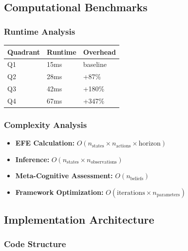 \documentclass[
]{article}
\newcounter{none} %
\providecommand{\tightlist}{%
  \setlength{\itemsep}{0pt}\setlength{\parskip}{0pt}}
\begin{document}
\subsection{Computational
Benchmarks}\label{sec:computational_benchmarks}

\subsubsection{Runtime Analysis}\label{runtime-analysis}

{\def\LTcaptype{none} %
\begin{longtable}[]{@{}lll@{}}
\toprule\noalign{}
Quadrant & Runtime & Overhead \\
\midrule\noalign{}
\endhead
\bottomrule\noalign{}
\endlastfoot
Q1 & 15ms & baseline \\
Q2 & 28ms & +87\% \\
Q3 & 42ms & +180\% \\
Q4 & 67ms & +347\% \\
\end{longtable}
}

\subsubsection{Complexity Analysis}\label{complexity-analysis}

\begin{itemize}
\tightlist
\item
  \textbf{EFE Calculation:}
  \(O(n_{\text{states}} \times n_{\text{actions}} \times \text{horizon})\)
\item
  \textbf{Inference:}
  \(O(n_{\text{states}} \times n_{\text{observations}})\)
\item
  \textbf{Meta-Cognitive Assessment:} \(O(n_{\text{beliefs}})\)
\item
  \textbf{Framework Optimization:}
  \(O(\text{iterations} \times n_{\text{parameters}})\)
\end{itemize}

\subsection{Implementation
Architecture}\label{sec:implementation_architecture}

\subsubsection{Code Structure}\label{code-structure}
\end{document}
